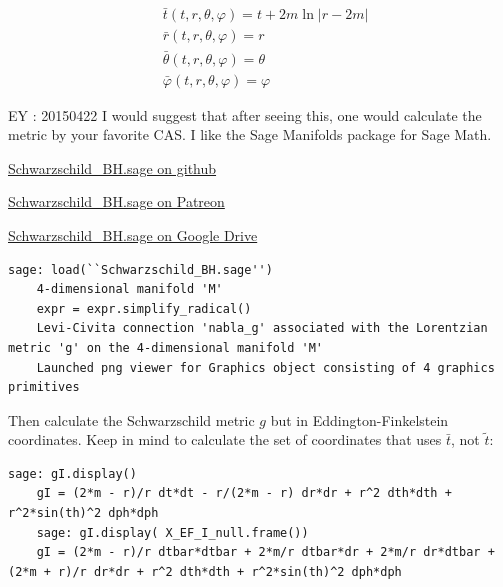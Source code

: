 	\[
	\begin{aligned}
	& \bar{t}(t,r,\theta,\varphi) = t + 2m\ln{ |r -2m | } \\
	& \bar{r}(t,r,\theta,\varphi) = r \\
	& \bar{\theta}(t,r,\theta,\varphi) = \theta \\
	& \bar{\varphi}(t,r,\theta,\varphi) = \varphi
	\end{aligned}
	\]
	
	EY : 20150422 I would suggest that after seeing this, one would calculate the metric by your favorite CAS.  I like the Sage Manifolds package for Sage Math.  
	
	\href{https://github.com/ernestyalumni/diffgeo-by-sagemnfd/blob/master/Schwarzschild_BH.sage}{Schwarzschild\_BH.sage on github}
	
	\href{https://www.patreon.com/file?s=645287&h=2254352&i=108637}{Schwarzschild\_BH.sage on Patreon}
	
	\href{https://drive.google.com/file/d/0B1H1Ygkr4EWJdllTR3czQU9DeW8/view?usp=sharing}{Schwarzschild\_BH.sage on Google Drive}
	
	\begin{lstlisting}[frame=single]
	sage: load(``Schwarzschild_BH.sage'')
	4-dimensional manifold 'M'
	expr = expr.simplify_radical()
	Levi-Civita connection 'nabla_g' associated with the Lorentzian metric 'g' on the 4-dimensional manifold 'M'
	Launched png viewer for Graphics object consisting of 4 graphics primitives
	\end{lstlisting}
	
	Then calculate the Schwarzschild metric $g$ but in Eddington-Finkelstein coordinates.  Keep in mind to calculate the set of coordinates that uses $\bar{t}$, not $\widetilde{t}$: 
	
	\begin{lstlisting}[frame=single]
	sage: gI.display()
	gI = (2*m - r)/r dt*dt - r/(2*m - r) dr*dr + r^2 dth*dth + r^2*sin(th)^2 dph*dph
	sage: gI.display( X_EF_I_null.frame())
	gI = (2*m - r)/r dtbar*dtbar + 2*m/r dtbar*dr + 2*m/r dr*dtbar + (2*m + r)/r dr*dr + r^2 dth*dth + r^2*sin(th)^2 dph*dph
	\end{lstlisting}








